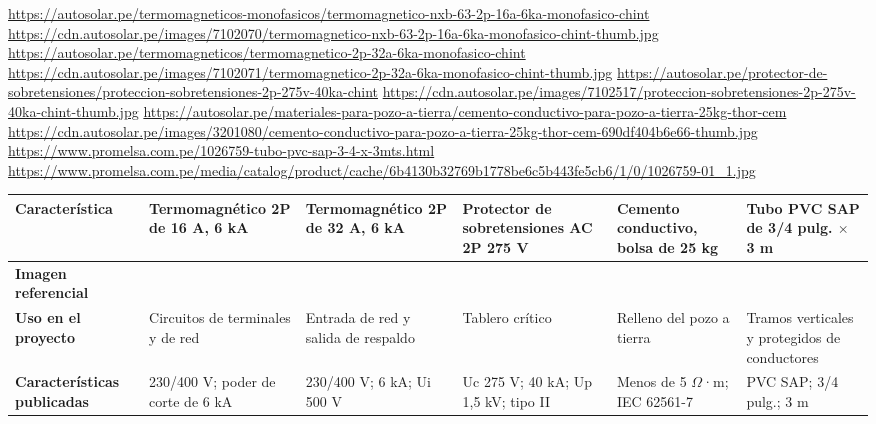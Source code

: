 \begin{landscape}
\urldef{\cotuel}\url{https://autosolar.pe/termomagneticos-monofasicos/termomagnetico-nxb-63-2p-16a-6ka-monofasico-chint}
\urldef{\cotuem}\url{https://cdn.autosolar.pe/images/7102070/termomagnetico-nxb-63-2p-16a-6ka-monofasico-chint-thumb.jpg}
\urldef{\cotuen}\url{https://autosolar.pe/termomagneticos/termomagnetico-2p-32a-6ka-monofasico-chint}
\urldef{\cotueo}\url{https://cdn.autosolar.pe/images/7102071/termomagnetico-2p-32a-6ka-monofasico-chint-thumb.jpg}
\urldef{\cotuep}\url{https://autosolar.pe/protector-de-sobretensiones/proteccion-sobretensiones-2p-275v-40ka-chint}
\urldef{\cotueq}\url{https://cdn.autosolar.pe/images/7102517/proteccion-sobretensiones-2p-275v-40ka-chint-thumb.jpg}
\urldef{\cotuer}\url{https://autosolar.pe/materiales-para-pozo-a-tierra/cemento-conductivo-para-pozo-a-tierra-25kg-thor-cem}
\urldef{\cotues}\url{https://cdn.autosolar.pe/images/3201080/cemento-conductivo-para-pozo-a-tierra-25kg-thor-cem-690df404b6e66-thumb.jpg}
\urldef{\cotuet}\url{https://www.promelsa.com.pe/1026759-tubo-pvc-sap-3-4-x-3mts.html}
\urldef{\cotueu}\url{https://www.promelsa.com.pe/media/catalog/product/cache/6b4130b32769b1778be6c5b443fe5cb6/1/0/1026759-01_1.jpg}
\par\noindent\begin{minipage}{\linewidth}\formatofichas
{}\label{tab:cot-u2}
\begin{tabularx}{\linewidth}{@{}>{\raggedright\arraybackslash}p{3.0cm}YYYYY@{}}
\toprule
\textbf{Característica} & \textbf{Termomagnético 2P de 16 A, 6 kA} & \textbf{Termomagnético 2P de 32 A, 6 kA} & \textbf{Protector de sobretensiones AC 2P 275 V} & \textbf{Cemento conductivo, bolsa de 25 kg} & \textbf{Tubo PVC SAP de 3/4 pulg. $\times$ 3 m}\\\midrule
\textbf{Imagen referencial} &  &  &  &  & \\
\textbf{Uso en el proyecto} & Circuitos de terminales y de red & Entrada de red y salida de respaldo & Tablero crítico & Relleno del pozo a tierra & Tramos verticales y protegidos de conductores\\
\textbf{Características publicadas} & 230/400 V; poder de corte de 6 kA & 230/400 V; 6 kA; Ui 500 V & Uc 275 V; 40 kA; Up 1,5 kV; tipo II & Menos de 5 $\Omega$·m; IEC 62561-7 & PVC SAP; 3/4 pulg.; 3 m\\

\end{tabularx}
\end{minipage}
\end{landscape}
